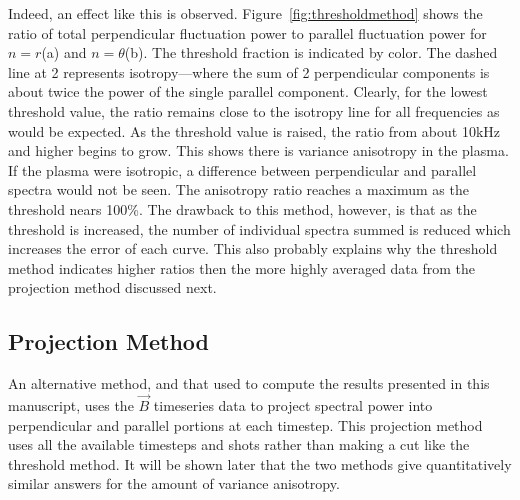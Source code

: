\documentclass[aip,prl,amsmath,amssymb,reprint,superscriptaddress]{revtex4-1} %
\begin{document}
Indeed, an effect like this is observed. Figure~\ref{fig:thresholdmethod} shows the ratio of total perpendicular fluctuation power to parallel fluctuation power for $n = r$(a) and $n = \theta$(b). The threshold fraction is indicated by color. The dashed line at 2 represents isotropy---where the sum of 2 perpendicular components is about twice the power of the single parallel component. Clearly, for the lowest threshold value, the ratio remains close to the isotropy line for all frequencies as would be expected. As the threshold value is raised, the ratio from about 10kHz and higher begins to grow. This shows there is variance anisotropy in the plasma. If the plasma were isotropic, a difference between perpendicular and parallel spectra would not be seen. The anisotropy ratio reaches a maximum as the threshold nears 100\%. The drawback to this method, however, is that as the threshold is increased, the number of individual spectra summed is reduced which increases the error of each curve. This also probably explains why the threshold method indicates higher ratios then the more highly averaged data from the projection method discussed next.

\subsection{Projection Method}

An alternative method, and that used to compute the results presented in this manuscript, uses the $\vec{B}$ timeseries data to project spectral power into perpendicular and parallel portions at each timestep. This projection method uses all the available timesteps and shots rather than making a cut like the threshold method. It will be shown later that the two methods give quantitatively similar answers for the amount of variance anisotropy.
\end{document}
